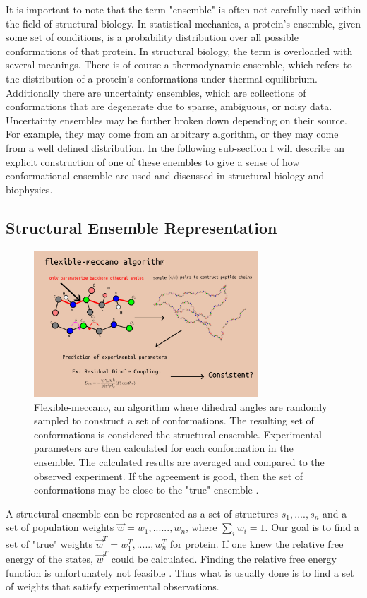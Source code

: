 \documentclass{article}
\begin{document}
It is important to note that the term "ensemble" is often not carefully used within the field of structural biology.
In statistical mechanics, a protein's ensemble, given some set of conditions, is a probability distribution over all possible conformations of that protein.
In structural biology, the term is overloaded with several meanings.\cite{gaalswykEmergingRolePhysical}
There is of course a thermodynamic ensemble, which refers to the distribution of a protein's conformations under thermal equilibrium.
Additionally there are uncertainty ensembles, which are collections of conformations that are degenerate due to sparse, ambiguous, or noisy data.
Uncertainty ensembles may be further broken down depending on their source.
For example, they may come from an arbitrary algorithm, or they may come from a well defined distribution.\cite{gaalswykEmergingRolePhysical}
In the following sub-section I will describe an explicit construction of one of these enembles to give a sense of how conformational ensemble are used and discussed in structural biology and biophysics. 


\subsection{Structural Ensemble Representation}
\begin{figure}[t]
    \centering
    \includegraphics[width=0.75\textwidth]{flexible-meccano}
    \caption{
        Flexible-meccano, an algorithm where dihedral angles are randomly sampled to construct a set of conformations. 
        The resulting set of conformations is considered the structural ensemble.
        Experimental parameters are then calculated for each conformation in the ensemble. 
        The calculated results are averaged and compared to the observed experiment.
        If the agreement is good, then the set of conformations may be close to the "true" ensemble \cite{ozenneFlexiblemeccanoToolGeneration2012}.
        \label{fig:flexible-meccano}
    }
\end{figure}
A structural ensemble can be represented as a set of structures ${s_1,....,s_n}$ and a set of population weights $\vec w = {w_1,......,w_n}$, where $\sum_i w_i = 1$. 
Our goal is to find a set of "true" weights $\vec w^T = {w_1^T,.....,w_n^T}$ for protein. 
If one knew the relative free energy of the states, $\vec w^T$ could be calculated.
Finding the relative free energy function is unfortunately not feasible \cite{freddolinoForceFieldBias2009}.
Thus what is usually done is to find a set of weights that satisfy experimental observations.
\end{document}

